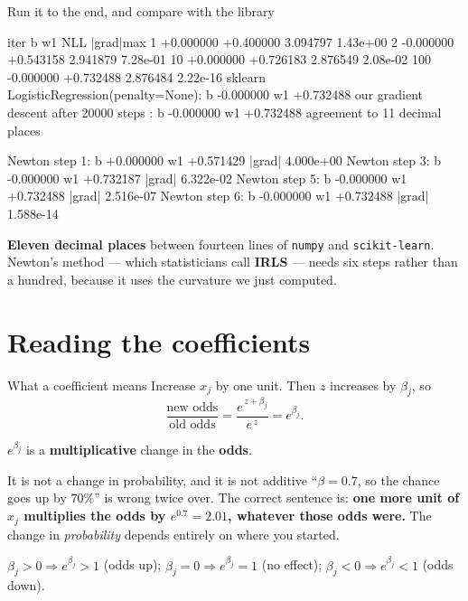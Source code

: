 \documentclass[aspectratio=169]{beamer}
\begin{document}
\begin{frame}[fragile,shrink=8]{Run it to the end, and compare with the library}
\begin{outblk}
  iter        b          w1        NLL      |grad|max
     1  +0.000000  +0.400000   3.094797    1.43e+00
     2  -0.000000  +0.543158   2.941879    7.28e-01
    10  +0.000000  +0.726183   2.876549    2.08e-02
   100  -0.000000  +0.732488   2.876484    2.22e-16
sklearn LogisticRegression(penalty=None):  b -0.000000  w1 +0.732488
our gradient descent after 20000 steps  :  b -0.000000  w1 +0.732488
agreement to 11 decimal places
\end{outblk}
\begin{outblk}
Newton step 1:  b +0.000000  w1 +0.571429  |grad| 4.000e+00
Newton step 3:  b -0.000000  w1 +0.732187  |grad| 6.322e-02
Newton step 5:  b -0.000000  w1 +0.732488  |grad| 2.516e-07
Newton step 6:  b -0.000000  w1 +0.732488  |grad| 1.588e-14
\end{outblk}
\begin{center}\small
  \textbf{Eleven decimal places} between fourteen lines of \texttt{numpy} and
  \texttt{scikit-learn}. Newton's method --- which statisticians call
  \textbf{IRLS} --- needs six steps rather than a hundred, because it uses
  the curvature we just computed.
\end{center}
\end{frame}

\section[Coefficients]{Reading the coefficients}
\label{sec:odds}

\begin{frame}[shrink=6]{What a coefficient means}
  Increase $x_j$ by one unit. Then $z$ increases by $\beta_j$, so
  \[
    \frac{\text{new odds}}{\text{old odds}}
    = \frac{e^{\,z+\beta_j}}{e^{\,z}} = e^{\beta_j}.
  \]
  \begin{exampleblock}{}
    \centering\large
    $e^{\beta_j}$ is a \textbf{multiplicative} change in the \textbf{odds}.
  \end{exampleblock}
  \vspace{0.2em}
  \begin{alertblock}{It is not a change in probability, and it is not additive}
    \small ``$\beta = 0.7$, so the chance goes up by $70\%$'' is wrong twice
    over. The correct sentence is: \textbf{one more unit of $x_j$ multiplies
    the odds by $e^{0.7} = 2.01$, whatever those odds were.} The change in
    \emph{probability} depends entirely on where you started.
  \end{alertblock}
  \begin{center}\small
    $\beta_j > 0 \Rightarrow e^{\beta_j} > 1$ (odds up);\;
    $\beta_j = 0 \Rightarrow e^{\beta_j} = 1$ (no effect);\;
    $\beta_j < 0 \Rightarrow e^{\beta_j} < 1$ (odds down).
  \end{center}
\end{frame}
\end{document}

